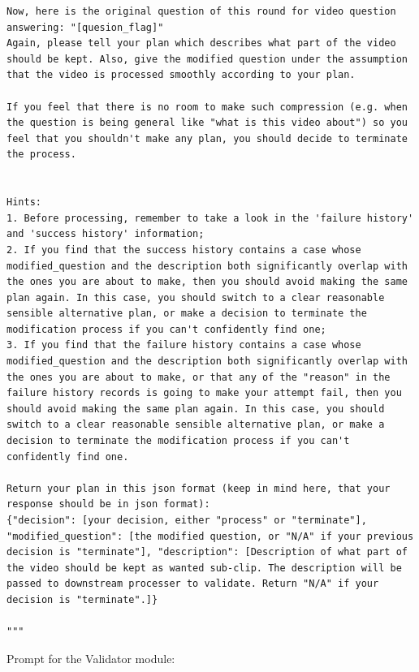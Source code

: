 \begin{lstlisting}
Now, here is the original question of this round for video question answering: "[quesion_flag]"
Again, please tell your plan which describes what part of the video should be kept. Also, give the modified question under the assumption that the video is processed smoothly according to your plan.

If you feel that there is no room to make such compression (e.g. when the question is being general like "what is this video about") so you feel that you shouldn't make any plan, you should decide to terminate the process.


Hints:
1. Before processing, remember to take a look in the 'failure history' and 'success history' information;
2. If you find that the success history contains a case whose modified_question and the description both significantly overlap with the ones you are about to make, then you should avoid making the same plan again. In this case, you should switch to a clear reasonable sensible alternative plan, or make a decision to terminate the modification process if you can't confidently find one;
3. If you find that the failure history contains a case whose modified_question and the description both significantly overlap with the ones you are about to make, or that any of the "reason" in the failure history records is going to make your attempt fail, then you should avoid making the same plan again. In this case, you should switch to a clear reasonable sensible alternative plan, or make a decision to terminate the modification process if you can't confidently find one.

Return your plan in this json format (keep in mind here, that your response should be in json format):
{"decision": [your decision, either "process" or "terminate"], "modified_question": [the modified question, or "N/A" if your previous decision is "terminate"], "description": [Description of what part of the video should be kept as wanted sub-clip. The description will be passed to downstream processer to validate. Return "N/A" if your decision is "terminate".]}

"""
\end{lstlisting}

Prompt for the Validator module:

